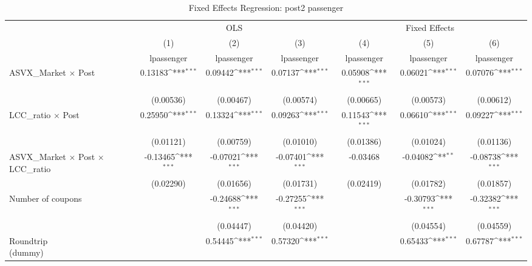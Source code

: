 \begin{table}[htbp]\centering
\def\sym#1{\ifmmode^{#1}\else\(^{#1}\)\fi}
\caption{Fixed Effects Regression: post2 passenger}
\begin{tabular}{l*{6}{c}}
\toprule
                    &\multicolumn{3}{c}{OLS}                                          &\multicolumn{3}{c}{Fixed Effects}                                \\\cmidrule(lr){2-4}\cmidrule(lr){5-7}
                    &\multicolumn{1}{c}{(1)}&\multicolumn{1}{c}{(2)}&\multicolumn{1}{c}{(3)}&\multicolumn{1}{c}{(4)}&\multicolumn{1}{c}{(5)}&\multicolumn{1}{c}{(6)}\\
                    &\multicolumn{1}{c}{lpassenger}&\multicolumn{1}{c}{lpassenger}&\multicolumn{1}{c}{lpassenger}&\multicolumn{1}{c}{lpassenger}&\multicolumn{1}{c}{lpassenger}&\multicolumn{1}{c}{lpassenger}\\
\midrule
ASVX\_Market $\times$ Post&     0.13183\sym{***}&     0.09442\sym{***}&     0.07137\sym{***}&     0.05908\sym{***}&     0.06021\sym{***}&     0.07076\sym{***}\\
                    &   (0.00536)         &   (0.00467)         &   (0.00574)         &   (0.00665)         &   (0.00573)         &   (0.00612)         \\
\addlinespace
LCC\_ratio $\times$ Post&     0.25950\sym{***}&     0.13324\sym{***}&     0.09263\sym{***}&     0.11543\sym{***}&     0.06610\sym{***}&     0.09227\sym{***}\\
                    &   (0.01121)         &   (0.00759)         &   (0.01010)         &   (0.01386)         &   (0.01024)         &   (0.01136)         \\
\addlinespace
ASVX\_Market $\times$ Post $\times$ LCC\_ratio&    -0.13465\sym{***}&    -0.07021\sym{***}&    -0.07401\sym{***}&    -0.03468         &    -0.04082\sym{**} &    -0.08738\sym{***}\\
                    &   (0.02290)         &   (0.01656)         &   (0.01731)         &   (0.02419)         &   (0.01782)         &   (0.01857)         \\
\addlinespace
Number of coupons   &                     &    -0.24688\sym{***}&    -0.27255\sym{***}&                     &    -0.30793\sym{***}&    -0.32382\sym{***}\\
                    &                     &   (0.04447)         &   (0.04420)         &                     &   (0.04554)         &   (0.04559)         \\
\addlinespace
\shortstack{Roundtrip \\ (dummy)}&                     &     0.54445\sym{***}&     0.57320\sym{***}&                     &     0.65433\sym{***}&     0.67787\sym{***}\\

\end{tabular}
\end{table}
